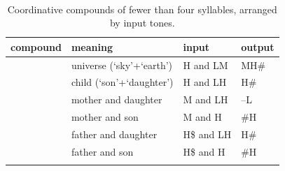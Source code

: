 ~\newline ~
~\newline  ~
~\newline  ~

\setlength{\defaultaddspace}{2.5pt}
\begin{subtables}
\begin{table}%
  \caption{Coordinative compounds of fewer than four syllables, arranged by input tones.}
  \begin{tabularx}{\textwidth}{ l Q l l }
    \lsptoprule
  	compound & meaning & input & output\\ \midrule
	 & universe (‘sky’+‘earth’) & H and LM & MH\#\\ \addlinespace \hdashline \addlinespace
	 & child (‘son’+‘daughter’) & H and LH & H\#\\ \addlinespace \hdashline \addlinespace
	 & mother and daughter & M and LH & --L\\ \addlinespace \hdashline \addlinespace
	 & mother and son & M and H & \#H\\ \addlinespace \hdashline \addlinespace
	 & father and daughter & H\$ and LH & H\#\\ \addlinespace \hdashline \addlinespace
	 & father and son & H\$ and H & \#H\\
\lspbottomrule
  \end{tabularx}
\label{tab:coordinativecompoundsmono}
\end{table}


\end{subtables}
